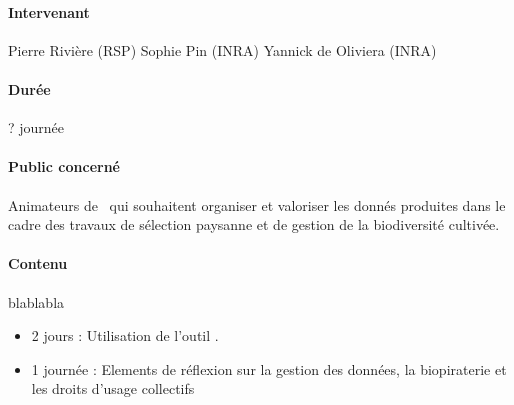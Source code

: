 \paragraph{Intervenant}
Pierre Rivière (RSP)
Sophie Pin (INRA)
Yannick de Oliviera (INRA)

\paragraph{Durée}
? journée

\paragraph{Public concerné}
Animateurs de \MSP~qui souhaitent organiser et valoriser les donnés produites dans le cadre des travaux de sélection paysanne et de gestion de la biodiversité cultivée.

\paragraph{Contenu}
blablabla

\begin{itemize}

\item 2 jours : Utilisation de l'outil \BDD.

\item 1 journée : Elements de réflexion sur la gestion des données, la biopiraterie et les droits d'usage collectifs

\end{itemize}

\newpage


